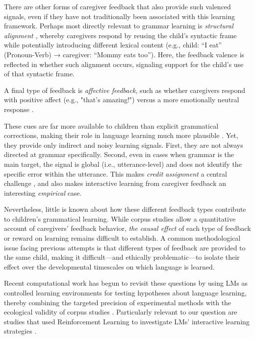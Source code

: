 There are other forms of caregiver feedback that also provide such valenced signals, even if they have not traditionally been associated with this learning framework. Perhaps most directly relevant to grammar learning is \textit{structural alignment} \cite{fusaroli_caregiver_2023, dale_unraveling_2006, fernandez_quantifying_2014, misiek_development_2020}, whereby caregivers respond by reusing the child's syntactic frame while potentially introducing different lexical content (e.g., child: “I eat” (Pronoun-Verb) → caregiver: “Mommy eats too”). Here, the feedback valence is reflected in whether such alignment occurs, signaling support for the child’s use of that syntactic frame.

A final type of feedback is \textit{affective feedback}, such as whether caregivers respond with positive affect (e.g., "that's amazing!") versus a more emotionally neutral response \cite{rivero2023relations}.
 
These cues are far more available to children than explicit grammatical corrections, making their role in language learning much more plausible \cite{demetras_feedback_1986, hirsh-pasek_brown_1984}. Yet, they provide only indirect and noisy learning signals. First, they are not always directed at grammar specifically. Second, even in cases when grammar is the main target, the signal is global (i.e., utterance-level) and does not identify the specific error within the utterance. This makes \textit{credit assignment} a central challenge \cite{marcus_negative_1993, pinker_learnability_1989, saxton_contrast_1997}, and also makes interactive learning from caregiver feedback an interesting \emph{empirical} case.

Nevertheless, little is known about how these different feedback types contribute to children’s grammatical learning. While corpus studies allow a quantitative account of caregivers' feedback behavior, \textit{the causal effect} of each type of feedback or reward on learning remains difficult to establish. A common methodological issue facing previous attempts \cite[e.g., see discussion in][]{saxton_negative_2005} is that different types of feedback are provided to the same child, making it difficult---and ethically problematic---to isolate their effect over the developmental timescales on which language is learned.

Recent computational work has begun to revisit these questions by using LMs as controlled learning environments for testing hypotheses about language learning, thereby combining the targeted precision of experimental methods with the ecological validity of corpus studies \cite[e.g.,][]{misra2024language}. Particularly relevant to our  question are studies that used Reinforcement Learning to investigate LMs' interactive learning strategies \cite{ma_babysit_2024, martins-etal-2025-upon, zhao-etal-2023-babystories, padovani2025dialogue, xu2025wanting, nikolaus_modeling_2021}.

